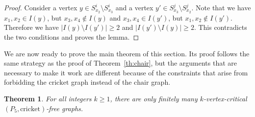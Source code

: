 \documentclass[10pt]{article}
\newtheorem{theorem}[thm]{Theorem}
\theoremstyle{definition}
\begin{document}
\begin{proof}
Consider a vertex $y \in S_{x_2}^i \setminus S_{x_3}^i$ and a vertex $y' \in S_{x_3}^j \setminus S_{x_2}^j$. Note that we have $x_1, x_2 \in I(y)$, but $x_3, x_4 \notin I(y)$ and $x_3, x_4 \in I(y')$, but $x_1, x_2 \notin I(y')$. Therefore we have $|I(y) \setminus I(y')| \geq 2$ and $|I(y') \setminus I(y)| \geq 2$. This contradicts the two conditions and proves the lemma.
\end{proof}

We are now ready to prove the main theorem of this section. Its proof follows the same strategy as the proof of Theorem~\ref{th:chair}, but the arguments that are necessary to make it work are different because of the constraints that arise from forbidding the $\text{cricket}$ graph instead of the $\text{chair}$ graph.

\begin{theorem}
\label{th:cricket}
    For all integers $k \geq 1$, there are only finitely many $k$-vertex-critical $(P_5,\text{cricket})$-free graphs.
\end{theorem}
\end{document}
